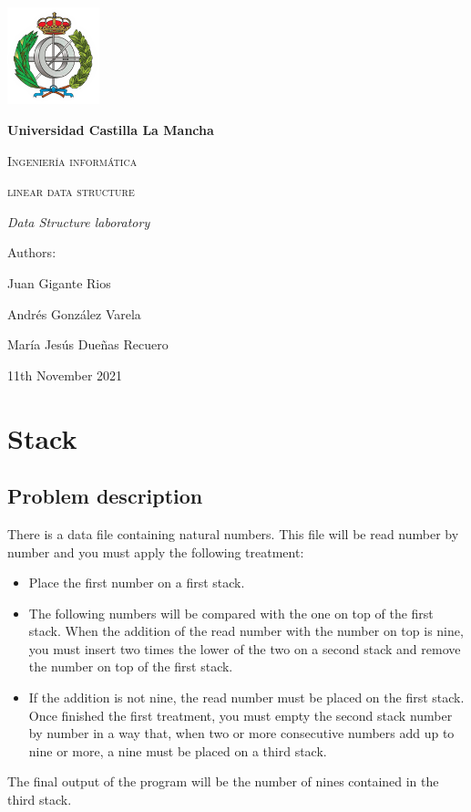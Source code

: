 \documentclass[a4paper]{article}
\theoremstyle{plain}
\theoremstyle{definition}
\begin{document}
    \begin{titlepage}
        \centering
        {\includegraphics[width=0.2\textwidth]{logo}\par}
        \vspace{1cm}
        {\bfseries\LARGE Universidad Castilla La Mancha \par}
        \vspace{1cm}
        {\scshape\Large Ingeniería informática \par}
        \vspace{3cm}
        {\scshape\Huge linear data structure \par}
        \vspace{3cm}
        {\itshape\Large Data Structure laboratory\par}
        \vfill
        {\Large Authors: \par}
        {\Large  Juan Gigante Rios\par Andrés González Varela  \par  María Jesús Dueñas Recuero }
        \vfill
        {\Large 11th November 2021 \par}
    \end{titlepage}
	

\newpage
	\tableofcontents
	\newpage
	\section{Stack}
        \subsection{Problem description}
        There is a data file containing natural numbers. This file will be read number by number and you must apply the following treatment:
        \begin{itemize}
            \item Place the first number on a first stack.
            \item The following numbers will be compared with the one on top of the first stack. When the addition of the read number with the number on top is nine, you must insert two times the lower of the two on a second stack and remove the number on top of the first stack.
            \item If the addition is not nine, the read number must be placed on the first stack. Once finished the first treatment, you must empty the second stack number by number in a way that, when two or more consecutive numbers add up to nine or more, a nine must be placed on a third stack.
        \end{itemize}
        The final output of the program will be the number of nines contained in the third stack.
\end{document}
